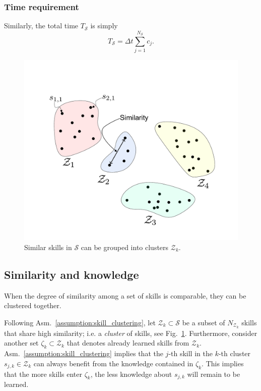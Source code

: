 \subsubsection{\textbf{Time requirement}}
Similarly, the total time $T_{\mathcal{S}}$ is simply
\begin{equation}\label{eq:total_energy}
	T_{\mathcal{S}} = \Delta t \sum_{j=1}^{{N_{\mathcal{S}}}} c_j.
\end{equation}
\begin{figure}[!t]
	\centering
	\includegraphics[width=0.9\columnwidth]{fig/skill_similarity.pdf}
	\caption{Similar skills in $\mathcal{S}$ can be grouped into clusters $\mathcal{Z}_k$.}
	\label{fig:skill_similarity}
\end{figure}
\subsection{Similarity and knowledge}
\begin{tcolorbox}
	\begin{assumption}\label{assumption:skill_clustering} When the degree of similarity among a set of skills is comparable, they can be clustered together.
		\end{assumption}
\end{tcolorbox}
Following Asm.~\ref{assumption:skill_clustering}, let $\mathcal{Z}_k \subset \mathcal{S}$ be a subset of $N_{\mathcal{Z}_k}$ skills that share high similarity; i.e. a \emph{cluster} of skills, see Fig.~\ref{fig:skill_similarity}. Furthermore, consider another set $\mathcal{\zeta}_k \subset \mathcal{Z}_k$ that denotes already learned skills from $\mathcal{Z}_k$. Asm.~\ref{assumption:skill_clustering} implies that the $j$-th skill in the $k$-th cluster $s_{j,k} \in \mathcal{Z}_k$ can always benefit from the knowledge contained in $\mathcal{\zeta}_k$. This implies that the more skills enter $\mathcal{\zeta}_k$, the less knowledge about $ s_{j,k} $ will remain to be learned.

